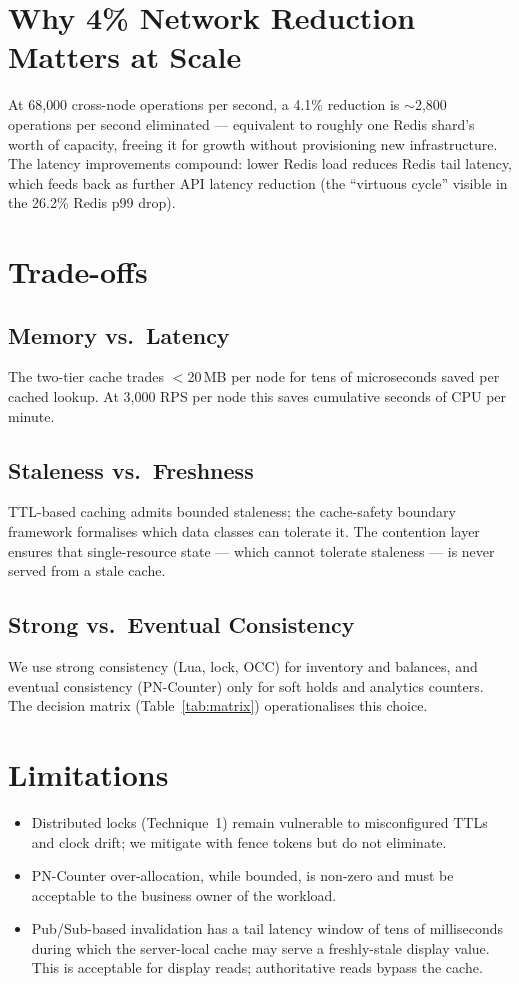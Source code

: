 \section{Why 4\% Network Reduction Matters at Scale}
At 68{,}000 cross-node operations per second, a 4.1\% reduction is $\sim$2{,}800 operations per second eliminated --- equivalent to roughly one Redis shard's worth of capacity, freeing it for growth without provisioning new infrastructure. The latency improvements compound: lower Redis load reduces Redis tail latency, which feeds back as further API latency reduction (the ``virtuous cycle'' visible in the 26.2\% Redis p99 drop).

\section{Trade-offs}

\subsection{Memory vs.\ Latency}
The two-tier cache trades $<$20\,MB per node for tens of microseconds saved per cached lookup. At 3{,}000 RPS per node this saves cumulative seconds of CPU per minute.

\subsection{Staleness vs.\ Freshness}
TTL-based caching admits bounded staleness; the cache-safety boundary framework formalises which data classes can tolerate it. The contention layer ensures that single-resource state --- which cannot tolerate staleness --- is never served from a stale cache.

\subsection{Strong vs.\ Eventual Consistency}
We use strong consistency (Lua, lock, OCC) for inventory and balances, and eventual consistency (PN-Counter) only for soft holds and analytics counters. The decision matrix (Table~\ref{tab:matrix}) operationalises this choice.

\section{Limitations}
\begin{itemize}[leftmargin=*]
    \item Distributed locks (Technique~1) remain vulnerable to misconfigured TTLs and clock drift; we mitigate with fence tokens but do not eliminate.
    \item PN-Counter over-allocation, while bounded, is non-zero and must be acceptable to the business owner of the workload.
    \item Pub/Sub-based invalidation has a tail latency window of tens of milliseconds during which the server-local cache may serve a freshly-stale display value. This is acceptable for display reads; authoritative reads bypass the cache.
\end{itemize}

